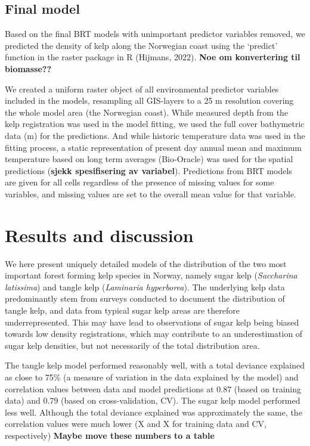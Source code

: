 \documentclass[
]{article}
\begin{document}
\hypertarget{final-model}{%
\subsection{Final model}\label{final-model}}

Based on the final BRT models with unimportant predictor variables
removed, we predicted the density of kelp along the Norwegian coast
using the `predict' function in the raster package in R (Hijmans, 2022).
\textbf{Noe om konvertering til biomasse??}

We created a uniform raster object of all environmental predictor
variables included in the models, resampling all GIS-layers to a 25 m
resolution covering the whole model area (the Norwegian coast). While
measured depth from the kelp registration was used in the model fitting,
we used the full cover bathymetric data (m) for the predictions. And
while historic temperature data was used in the fitting process, a
static representation of present day annual mean and maximum temperature
based on long term averages (Bio-Oracle) was used for the spatial
predictions (\textbf{sjekk spesifisering av variabel}). Predictions from
BRT models are given for all cells regardless of the presence of missing
values for some variables, and missing values are set to the overall
mean value for that variable.

\hypertarget{results-and-discussion}{%
\section{Results and discussion}\label{results-and-discussion}}

We here present uniquely detailed models of the distribution of the two
most important forest forming kelp species in Norway, namely sugar kelp
(\emph{Saccharina latissima}) and tangle kelp (\emph{Laminaria
hyperborea}). The underlying kelp data predominantly stem from surveys
conducted to document the distribution of tangle kelp, and data from
typical sugar kelp areas are therefore underrepresented. This may have
lead to observations of sugar kelp being biased towards low density
registrations, which may contribute to an underestimation of sugar kelp
densities, but not necessarily of the total distribution area.

The tangle kelp model performed reasonably well, with a total deviance
explained as close to 75\% (a measure of variation in the data explained
by the model) and correlation values between data and model predictions
at 0.87 (based on training data) and 0.79 (based on cross-validation,
CV). The sugar kelp model performed less well. Although the total
deviance explained was approximately the same, the correlation values
were much lower (X and X for training data and CV, respectively)
\textbf{Maybe move these numbers to a table}
\end{document}
